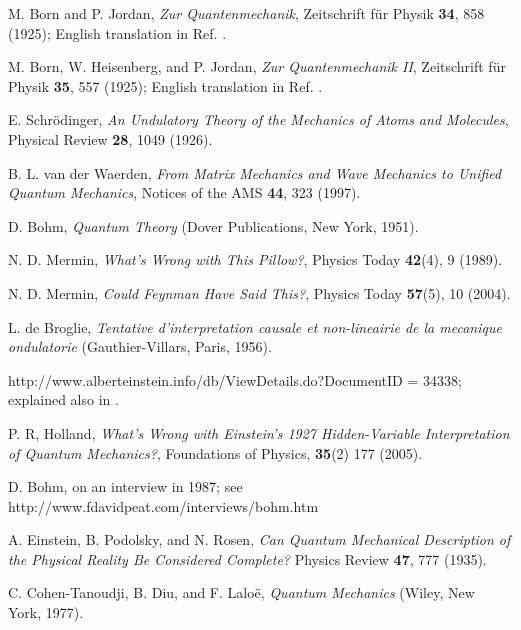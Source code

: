 \documentclass[nofootinbib, secnumarabic, amsmath, nobibnotes,11pt,aps,pra, floatfix]{revtex4-1}
\begin{document}
\begin{thebibliography}{999}
M. Born and P. Jordan, \emph{Zur Quantenmechanik}, Zeitschrift f\"{u}r Physik \textbf{34},  858 (1925); English translation in Ref. \cite{om.waerden}.

M. Born, W. Heisenberg, and P. Jordan, \emph{Zur Quantenmechanik II}, Zeitschrift f\"{u}r Physik \textbf{35},  557 (1925); English translation in Ref. \cite{om.waerden}.

E. Schr\"odinger, \emph{An Undulatory Theory of the Mechanics of Atoms and Molecules}, Physical Review \textbf{28},  1049 (1926).

B. L. van der Waerden, \emph{From Matrix Mechanics and Wave Mechanics to Unified Quantum Mechanics}, Notices of the AMS \textbf{44},  323 (1997).

D. Bohm, \emph{Quantum Theory} (Dover Publications, New York, 1951).

N. D. Mermin, \emph{What's Wrong with This Pillow?}, Physics Today \textbf{42}(4),  9 (1989).

N. D. Mermin, \emph{Could Feynman Have Said This?}, Physics Today \textbf{57}(5),  10 (2004).

L. de Broglie, \emph{Tentative d'interpretation causale et
non-lineairie de la mecanique ondulatorie} (Gauthier-Villars, Paris,
1956).

http://www.alberteinstein.info/db/ViewDetails.do?DocumentID = 34338; explained also in \cite{om.Hollaneinstein}.

P. R, Holland, \emph{What's Wrong with Einstein's 1927 Hidden-Variable Interpretation of Quantum Mechanics?}, Foundations of Physics,
\textbf{35}(2)  177 (2005).

D. Bohm, on an interview in 1987; see http://www.fdavidpeat.com/interviews/bohm.htm

A. Einstein, B. Podolsky, and N. Rosen, \emph{Can Quantum Mechanical Description of the Physical Reality Be Considered Complete?} Physics Review \textbf{47},  777 (1935).

C. Cohen-Tanoudji, B. Diu, and F. Lalo\"{e}, \emph{Quantum Mechanics} (Wiley, New York, 1977).


\end{thebibliography}
\end{document}
